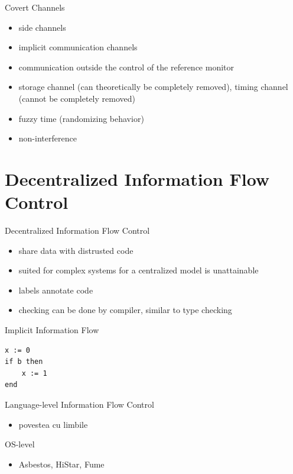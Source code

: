 \documentclass{curs}
\begin{document}
\begin{frame}{Covert Channels}
  \begin{itemize}
    \item side channels
    \item implicit communication channels
    \item communication outside the control of the reference monitor
    \item storage channel (can theoretically be completely removed), timing channel (cannot be completely removed)
    \item fuzzy time (randomizing behavior)
    \item non-interference
  \end{itemize}
\end{frame}

\section{Decentralized Information Flow Control}

\begin{frame}{Decentralized Information Flow Control}
  \begin{itemize}
    \item share data with distrusted code
    \item suited for complex systems for a centralized model is unattainable
    \item labels annotate code
    \item checking can be done by compiler, similar to type checking
  \end{itemize}
\end{frame}

\begin{frame}[fragile]{Implicit Information Flow}
  \begin{verbatim}
x := 0
if b then
    x := 1
end
  \end{verbatim}
\end{frame}

\begin{frame}{Language-level Information Flow Control}
  \begin{itemize}
    \item povestea cu limbile
  \end{itemize}
\end{frame}

\begin{frame}{OS-level}
  \begin{itemize}
    \item Asbestos, HiStar, Fume
  \end{itemize}
\end{frame}
\end{document}
